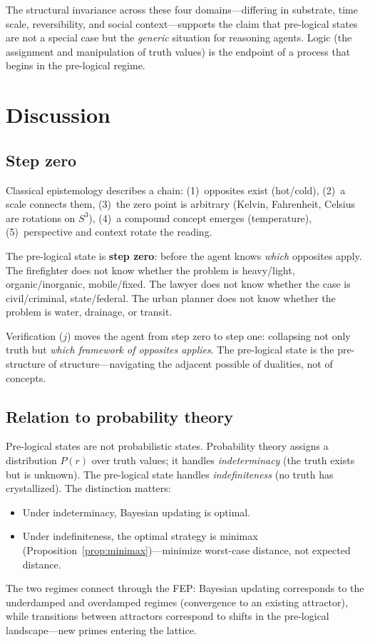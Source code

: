 \documentclass[11pt,a4paper]{article}
\begin{document}
The structural invariance across these four domains---differing in
substrate, time scale, reversibility, and social context---supports the
claim that pre-logical states are not a special case but the
\emph{generic} situation for reasoning agents. Logic (the assignment and
manipulation of truth values) is the endpoint of a process that begins
in the pre-logical regime.

\section{Discussion}
\label{sec:discussion}

\subsection{Step zero}

Classical epistemology describes a chain:
(1)~opposites exist (hot/cold),
(2)~a scale connects them,
(3)~the zero point is arbitrary (Kelvin, Fahrenheit, Celsius are
rotations on $S^3$),
(4)~a compound concept emerges (temperature),
(5)~perspective and context rotate the reading.

The pre-logical state is \textbf{step zero}: before the agent knows
\emph{which} opposites apply. The firefighter does not know whether the
problem is heavy/light, organic/inorganic, mobile/fixed. The lawyer
does not know whether the case is civil/criminal, state/federal. The
urban planner does not know whether the problem is water, drainage, or
transit.

Verification ($j$) moves the agent from step zero to step one:
collapsing not only truth but \emph{which framework of opposites
applies}. The pre-logical state is the pre-structure of structure---navigating
the adjacent possible of dualities, not of concepts.

\subsection{Relation to probability theory}

Pre-logical states are not probabilistic states. Probability theory
assigns a distribution $P(r)$ over truth values; it handles
\emph{indeterminacy} (the truth exists but is unknown). The pre-logical
state handles \emph{indefiniteness} (no truth has crystallized). The
distinction matters:
\begin{itemize}[nosep]
\item Under indeterminacy, Bayesian updating is optimal.
\item Under indefiniteness, the optimal strategy is minimax
  (Proposition~\ref{prop:minimax})---minimize worst-case distance, not
  expected distance.
\end{itemize}
The two regimes connect through the FEP: Bayesian updating corresponds
to the underdamped and overdamped regimes (convergence to an existing
attractor), while transitions between attractors correspond to shifts
in the pre-logical landscape---new primes entering the lattice.
\end{document}
